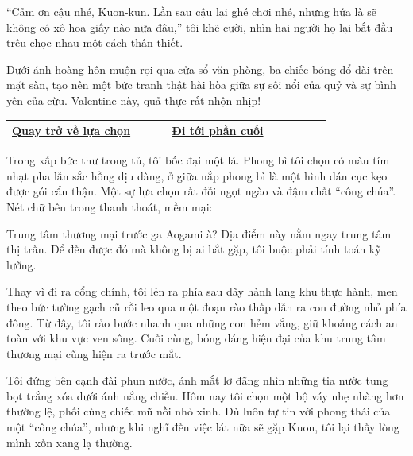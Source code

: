 \documentclass[../main.tex]{subfiles}
\begin{document}
``Cảm ơn cậu nhé, Kuon-kun. Lần sau cậu lại ghé chơi nhé, nhưng hứa là sẽ không có xô hoa giấy nào nữa đâu,'' tôi khẽ cười, nhìn hai người họ lại bắt đầu trêu chọc nhau một cách thân thiết.

Dưới ánh hoàng hôn muộn rọi qua cửa sổ văn phòng, ba chiếc bóng đổ dài trên mặt sàn, tạo nên một bức tranh thật hài hòa giữa sự sôi nổi của quỷ và sự bình yên của cừu. Valentine này, quả thực rất nhộn nhịp!

\begin{table}[H]
  \centering
  \setlength{\arrayrulewidth}{1pt}
  \begin{tabular}{|>{\centering\arraybackslash}p{0.4\linewidth}|>{\centering\arraybackslash}p{0.4\linewidth}|}
    \hline
    \hyperref[choice]{Quay trở về lựa chọn} & \hyperref[ending]{Đi tới phần cuối} \\ \hline
  \end{tabular}
\end{table}

\newpage
\label{mitsuki}

Trong xấp bức thư trong tủ, tôi bốc đại một lá. Phong bì tôi chọn có màu tím nhạt pha lẫn sắc hồng dịu dàng, ở giữa nắp phong bì là một hình dán cục kẹo được gói cẩn thận. Một sự lựa chọn rất đỗi ngọt ngào và đậm chất ``công chúa''. Nét chữ bên trong thanh thoát, mềm mại:


Trung tâm thương mại trước ga Aogami à? Địa điểm này nằm ngay trung tâm thị trấn. Để đến được đó mà không bị ai bắt gặp, tôi buộc phải tính toán kỹ lưỡng.

Thay vì đi ra cổng chính, tôi lẻn ra phía sau dãy hành lang khu thực hành, men theo bức tường gạch cũ rồi leo qua một đoạn rào thấp dẫn ra con đường nhỏ phía đông. Từ đây, tôi rảo bước nhanh qua những con hẻm vắng, giữ khoảng cách an toàn với khu vực ven sông. Cuối cùng, bóng dáng hiện đại của khu trung tâm thương mại cũng hiện ra trước mắt.

\ct


Tôi đứng bên cạnh đài phun nước, ánh mắt lơ đãng nhìn những tia nước tung bọt trắng xóa dưới ánh nắng chiều. Hôm nay tôi chọn một bộ váy nhẹ nhàng hơn thường lệ, phối cùng chiếc mũ nồi nhỏ xinh. Dù luôn tự tin với phong thái của một ``công chúa'', nhưng khi nghĩ đến việc lát nữa sẽ gặp Kuon, tôi lại thấy lòng mình xốn xang lạ thường.
\end{document}
